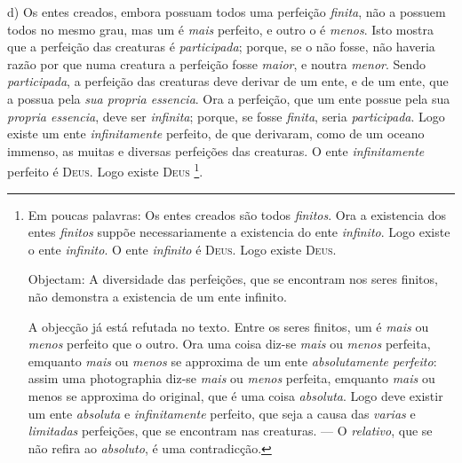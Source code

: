  d) Os entes creados, embora possuam todos uma perfeição \emph{finita}, não a possuem todos no mesmo grau, mas um é \emph{mais} perfeito, e outro o é \emph{menos}. Isto mostra que a perfeição das creaturas é \emph{participada}; porque, se o não fosse, não haveria razão por que numa creatura a perfeição fosse \emph{maior}, e noutra \emph{menor}. Sendo \emph{participada}, a perfeição das creaturas deve derivar de um ente, e de um ente, que a possua pela \emph{sua propria essencia}. Ora a perfeição, que um ente possue pela sua \emph{propria essencia}, deve ser \emph{infinita}; porque, se fosse \emph{finita}, seria \emph{participada}. Logo existe um ente \emph{infinitamente} perfeito, de que derivaram, como de um oceano immenso, as muitas e diversas perfeições das creaturas. O ente \emph{infinitamente} perfeito é \textsc{Deus}. Logo existe \textsc{Deus} \footnote{Em poucas palavras: Os entes creados são todos \emph{finitos}. Ora a existencia dos entes \emph{finitos} suppõe necessariamente a existencia do ente \emph{infinito}. Logo existe o ente \emph{infinito}. O ente \emph{infinito} é \textsc{Deus}. Logo existe \textsc{Deus}.\par Objectam: A diversidade das perfeições, que se encontram nos seres finitos, não demonstra a existencia de um ente infinito.\par A objecção já está refutada no texto. Entre os seres finitos, um é \emph{mais} ou \emph{menos} perfeito que o outro. Ora uma coisa diz-se \emph{mais} ou \emph{menos} perfeita, emquanto \emph{mais} ou \emph{menos} se approxima de um ente \emph{absolutamente perfeito}: assim uma photographia diz-se \emph{mais} ou \emph{menos} perfeita, emquanto \emph{mais} ou menos se approxima do original, que é uma coisa \emph{absoluta}. Logo deve existir um ente \emph{absoluta} e \emph{infinitamente} perfeito, que seja a causa das \emph{varias} e \emph{limitadas} perfeições, que se encontram nas creaturas. --- O \emph{relativo}, que se não refira ao \emph{absoluto}, é uma contradicção.}.

